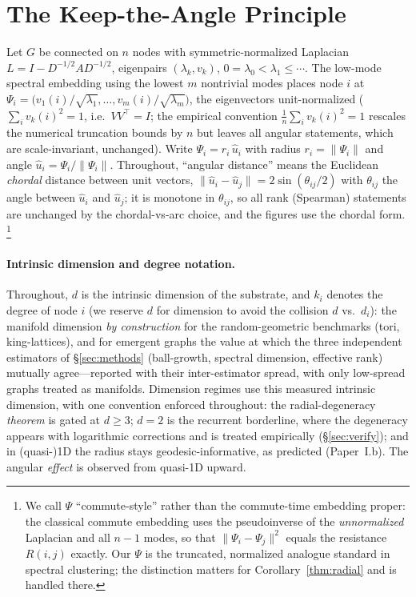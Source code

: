 \documentclass[11pt]{article}
\theoremstyle{remark}
\begin{document}
\section{The Keep-the-Angle Principle}\label{sec:thm}
Let $G$ be connected on $n$ nodes with symmetric-normalized Laplacian
$L = I - D^{-1/2} A D^{-1/2}$, eigenpairs $(\lambda_k, v_k)$,
$0=\lambda_0<\lambda_1\le\cdots$. The low-mode spectral embedding using the
lowest $m$ nontrivial modes places node $i$ at
$\Psi_i = \big(v_1(i)/\sqrt{\lambda_1},\dots,v_m(i)/\sqrt{\lambda_m}\big)$, the
eigenvectors unit-normalized ($\sum_i v_k(i)^2=1$, i.e.\ $VV^\top=I$; the empirical
convention $\tfrac1n\sum_i v_k(i)^2=1$ rescales the numerical truncation bounds by
$n$ but leaves all angular statements, which are scale-invariant, unchanged).
Write $\Psi_i = r_i\,\hat u_i$ with radius $r_i=\lVert\Psi_i\rVert$ and angle
$\hat u_i = \Psi_i/\lVert\Psi_i\rVert$. Throughout, ``angular distance''
means the Euclidean \emph{chordal} distance between unit vectors,
$\lVert\hat u_i-\hat u_j\rVert=2\sin(\theta_{ij}/2)$ with $\theta_{ij}$ the
angle between $\hat u_i$ and $\hat u_j$; it is monotone in $\theta_{ij}$, so all
rank (Spearman) statements are unchanged by the chordal-vs-arc choice, and the
figures use the chordal form.
\footnote{We call $\Psi$ ``commute-style'' rather than the commute-time
embedding proper: the classical commute embedding uses the pseudoinverse of the
\emph{unnormalized} Laplacian and all $n-1$ modes, so that
$\lVert\Psi_i-\Psi_j\rVert^2$ equals the resistance $R(i,j)$ exactly. Our
$\Psi$ is the truncated, normalized analogue standard in spectral clustering;
the distinction matters for Corollary~\ref{thm:radial} and is handled there.}

\paragraph{Intrinsic dimension and degree notation.} Throughout, $d$ is the
intrinsic dimension of the substrate, and $k_i$ denotes the degree of node
$i$ (we reserve $d$ for dimension to avoid the collision $d$ vs.\ $d_i$): the
manifold dimension \emph{by construction} for the random-geometric benchmarks
(tori, king-lattices), and for emergent graphs the value at which the
three independent estimators of \S\ref{sec:methods} (ball-growth, spectral
dimension, effective rank) mutually agree---reported with their inter-estimator
spread, with only low-spread graphs treated as manifolds. Dimension regimes
use this measured intrinsic dimension, with one convention enforced throughout:
the radial-degeneracy \emph{theorem} is gated at $d\ge3$; $d=2$ is the recurrent
borderline, where the degeneracy appears with logarithmic corrections and is
treated empirically (\S\ref{sec:verify}); and in (quasi-)1D the radius stays
geodesic-informative, as predicted (Paper~I.b). The angular \emph{effect}
is observed from quasi-1D upward.
\end{document}
